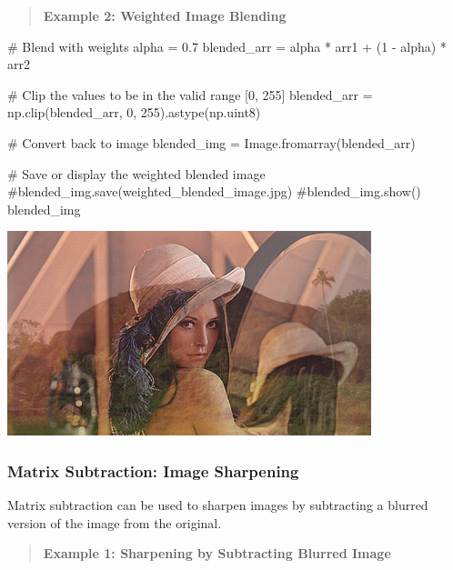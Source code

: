 \documentclass[
  letterpaper,
  DIV=11,
  numbers=noendperiod]{scrreprt}
\newenvironment{Shaded}{\begin{snugshade}}{\end{snugshade}}
\newcommand{\CommentTok}[1]{\textcolor[rgb]{0.37,0.37,0.37}{#1}}
\newcommand{\DecValTok}[1]{\textcolor[rgb]{0.68,0.00,0.00}{#1}}
\newcommand{\FloatTok}[1]{\textcolor[rgb]{0.68,0.00,0.00}{#1}}
\newcommand{\NormalTok}[1]{\textcolor[rgb]{0.00,0.23,0.31}{#1}}
\newcommand{\OperatorTok}[1]{\textcolor[rgb]{0.37,0.37,0.37}{#1}}
\theoremstyle{plain}
\theoremstyle{definition}
\theoremstyle{remark}
\begin{document}
\begin{quote}
\textbf{Example 2: Weighted Image Blending}
\end{quote}

\begin{Shaded}
\begin{Highlighting}[]
\CommentTok{\# Blend with weights}
\NormalTok{alpha }\OperatorTok{=} \FloatTok{0.7}
\NormalTok{blended\_arr }\OperatorTok{=}\NormalTok{ alpha }\OperatorTok{*}\NormalTok{ arr1 }\OperatorTok{+}\NormalTok{ (}\DecValTok{1} \OperatorTok{{-}}\NormalTok{ alpha) }\OperatorTok{*}\NormalTok{ arr2}

\CommentTok{\# Clip the values to be in the valid range [0, 255]}
\NormalTok{blended\_arr }\OperatorTok{=}\NormalTok{ np.clip(blended\_arr, }\DecValTok{0}\NormalTok{, }\DecValTok{255}\NormalTok{).astype(np.uint8)}

\CommentTok{\# Convert back to image}
\NormalTok{blended\_img }\OperatorTok{=}\NormalTok{ Image.fromarray(blended\_arr)}

\CommentTok{\# Save or display the weighted blended image}
\CommentTok{\#blended\_img.save(\textquotesingle{}weighted\_blended\_image.jpg\textquotesingle{})}
\CommentTok{\#blended\_img.show()}
\NormalTok{blended\_img}
\end{Highlighting}
\end{Shaded}

\includegraphics{module_1_files/figure-pdf/cell-12-output-1.png}

\subsubsection{Matrix Subtraction: Image
Sharpening}\label{matrix-subtraction-image-sharpening}

Matrix subtraction can be used to sharpen images by subtracting a
blurred version of the image from the original.

\begin{quote}
\textbf{Example 1: Sharpening by Subtracting Blurred Image}
\end{quote}
\end{document}
